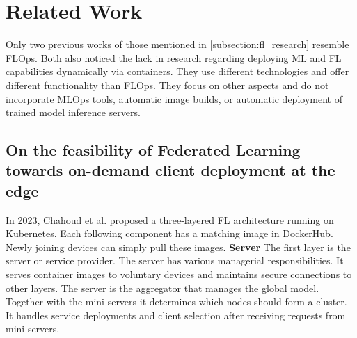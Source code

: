 \section{Related Work}

Only two previous works \cite{paper:fl_toward_on_demand_client_deployment_at_edge, paper:global_fl_platform_for_iot} of those mentioned in \ref{subsection:fl_research} resemble FLOps.
Both also noticed the lack in research regarding deploying ML and FL capabilities dynamically via containers.
They use different technologies and offer different functionality than FLOps.
They focus on other aspects and do not incorporate MLOps tools, automatic image builds, or automatic deployment of trained model inference servers.

\subsection{On the feasibility of Federated Learning towards on-demand client deployment at the edge}
In 2023, Chahoud et al. \cite{paper:fl_toward_on_demand_client_deployment_at_edge} proposed a three-layered FL architecture running on Kubernetes.
Each following component has a matching image in DockerHub.
Newly joining devices can simply pull these images.
\vspace{5mm}
\newline
\textbf{Server}\newline
The first layer is the server or service provider.
The server has various managerial responsibilities.
It serves container images to voluntary devices and maintains secure connections to other layers.
The server is the aggregator that manages the global model.
Together with the mini-servers it determines which nodes should form a cluster.
It handles service deployments and client selection after receiving requests from mini-servers.

